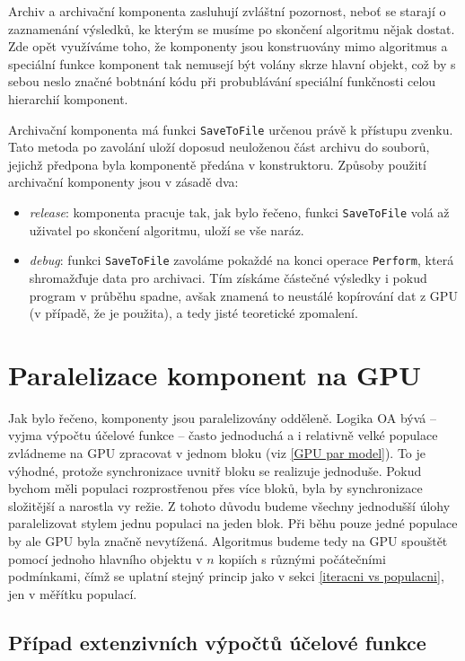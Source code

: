 Archiv a archivační komponenta zasluhují zvláštní pozornost, neboť se starají o zaznamenání výsledků, ke kterým se musíme po skončení algoritmu nějak dostat. Zde opět využíváme toho, že komponenty jsou konstruovány mimo algoritmus a speciální funkce komponent tak nemusejí být volány skrze hlavní objekt, což by s sebou neslo značné bobtnání kódu při probublávání speciální funkčnosti celou hierarchií komponent. 

Archivační komponenta má funkci \texttt{SaveToFile} určenou právě k přístupu zvenku. Tato metoda po zavolání uloží doposud neuloženou část archivu do souborů, jejichž předpona byla komponentě předána v konstruktoru. Způsoby použití archivační komponenty jsou v zásadě dva:
\begin{itemize}
  \item \emph{release}: komponenta pracuje tak, jak bylo řečeno, funkci \texttt{SaveToFile} volá až uživatel po skončení algoritmu, uloží se vše naráz.
  \item \emph{debug}: funkci \texttt{SaveToFile} zavoláme pokaždé na konci operace \texttt{Perform}, která shromažďuje data pro archivaci. Tím získáme částečné výsledky i pokud program v průběhu spadne, avšak znamená to neustálé kopírování dat z GPU (v případě, že je použita), a tedy jisté teoretické zpomalení.
\end{itemize}

\section{Paralelizace komponent na GPU}

Jak bylo řečeno, komponenty jsou paralelizovány odděleně. Logika OA bývá -- vyjma výpočtu účelové funkce -- často jednoduchá a i relativně velké populace zvládneme na GPU zpracovat v jednom bloku (viz \ref{GPU par model}). To je výhodné, protože synchronizace uvnitř bloku se realizuje jednoduše. Pokud bychom měli populaci rozprostřenou přes více bloků, byla by synchronizace složitější a narostla vy režie. Z tohoto důvodu budeme všechny jednodušší úlohy paralelizovat stylem jednu populaci na jeden blok. Při běhu pouze jedné populace by ale GPU byla značně nevytížená. Algoritmus budeme tedy na GPU spouštět pomocí jednoho hlavního objektu v $n$ kopiích s různými počátečními podmínkami, čímž se uplatní stejný princip jako v sekci \ref{iteracni vs populacni}, jen v měřítku populací.

\subsection{Případ extenzivních výpočtů účelové funkce}

